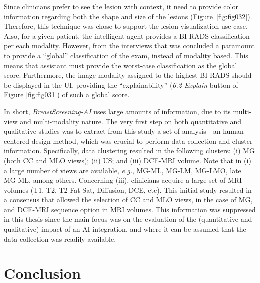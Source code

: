 Since clinicians prefer to see the lesion with context, it need to provide color information regarding both the shape and size of the lesions (Figure~\ref{fig:fig032}).
Therefore, this technique was chose to support the lesion visualization use case.
Also, for a given patient, the intelligent agent provides a \ac{BI-RADS} classification per each modality.
However, from the interviews that was concluded a paramount to provide a ``global'' classification of the exam, instead of modality based.
This means that assistant must provide the worst-case classification as the global score.
Furthermore, the image-modality assigned to the highest \ac{BI-RADS} should be displayed in the \ac{UI}, providing the ``explainability'' ({\it 6.2 Explain} button of Figure \ref{fig:fig031}) of such a global score.

In short, {\it BreastScreening-AI} uses large amounts of information, due to its multi-view and multi-modality nature.
The very first step on both quantitative and qualitative studies was to extract from this study a set of analysis - an human-centered design method, which was crucial to perform data collection and cluster information.
Specifically, data clustering resulted in the following clusters:
(i) \ac{MG} (both \ac{CC} and \ac{MLO} views);
(ii) \ac{US}; and
(iii) \ac{DCE}-\ac{MRI} volume.
Note that in (i) a large number of views are available, {\it e.g.}, MG-ML, MG-LM, MG-LMO, late MG-ML, among others.
Concerning (iii), clinicians acquire a large set of \ac{MRI} volumes (T1, T2, T2 Fat-Sat, Diffusion, \ac{DCE}, etc).
This initial study resulted in a consensus that allowed the selection of \ac{CC} and \ac{MLO} views, in the case of \ac{MG}, and \ac{DCE}-\ac{MRI} sequence option in \ac{MRI} volumes.
This information was suppressed in this thesis since the main focus was on the evaluation of the (quantitative and qualitative) impact of an \ac{AI} integration, and where it can be assumed that the data collection was readily available.

\section{Conclusion}
\label{sec:chap005008}

